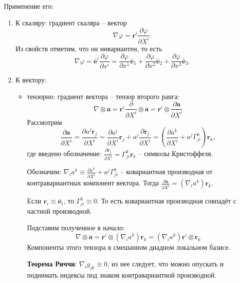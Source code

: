 Применение его:
\begin{enumerate}
  \item К скаляру: градиент скаляра -- вектор
    \[
      \nabla \varphi = \mathbf{r}^i \frac{\partial \varphi}{\partial X^i}.
    \]
    Из свойств отметим, что он инвариантен, то есть 
    \[
      \nabla \varphi = \bar{\mathbf{e}}^i \frac{\partial \varphi}{\partial x^i} 
      = \frac{\partial \varphi}{\partial x^1} \bar{\mathbf{e}}_1 + \frac{\partial \varphi}{\partial x^2} \bar{\mathbf{e}}_2 + \frac{\partial \varphi}{\partial x^3} \bar{\mathbf{e}}_3.
    \]

  \item К вектору:
    \begin{itemize}
      \item тензорно: градиент вектора -- тензор второго ранга:
        \[
          \nabla \otimes \mathbf{a}
          = \mathbf{r}^i \frac{\partial }{\partial X^i} \otimes \mathbf{a}
          = \mathbf{r}^i \otimes \frac{\partial \mathbf{a}}{\partial X^i} 
        \]
        Рассмотрим
        \[
          \frac{\partial \mathbf{a}}{\partial X^i} 
          = \frac{\partial a^j \mathbf{r}_j}{\partial X^i} 
          = \frac{\partial a^j}{\partial X^i} \mathbf{r}_j
            + a^j \frac{\partial \mathbf{r}_j}{\partial X^i} 
            = \left( \frac{\partial a^k}{\partial X^i} + a^j \Gamma^k_{ji} \right) \mathbf{r}_k,
        \]
        где введено обозначение:
        $ \frac{\partial \mathbf{r}_j}{\partial X^i} 
          = \Gamma^k_{ji} \mathbf{r}_k $
        -- символы Кристоффеля.

        Обозначим: $\nabla_i a^k \equiv \frac{\partial a^k}{\partial X^i} + a^j \Gamma^k_{ji}$
        -- ковариантная производная от контравариантных компонент вектора.
        Тогда $ \frac{\partial \mathbf{a}}{\partial X^i} = (\nabla_i a^k) \mathbf{r}_k$.

        Если $\mathbf{r}_i \equiv \bar{\mathbf{e}}_i$, то $\Gamma^k_{ji} \equiv 0$. То есть
        ковариантная производная совпадёт с частной производной.

        Подставим полученное в начало:
        \[
          \nabla \otimes \mathbf{a} = \mathbf{r}^i \otimes (\nabla_i a^k) \mathbf{r}_k 
          = (\nabla_i a^k) \mathbf{r}^i \otimes \mathbf{r}_k
        \]
        Компоненты этого тензора в смешанном диадном локальном базисе.

        \textbf{Теорема Риччи}: $\nabla_i g_{jk} \equiv 0$, из нее следует, что можно опускать и 
        поднимать индексы под знаком контравариантной производной.


\end{itemize}
\end{enumerate}
